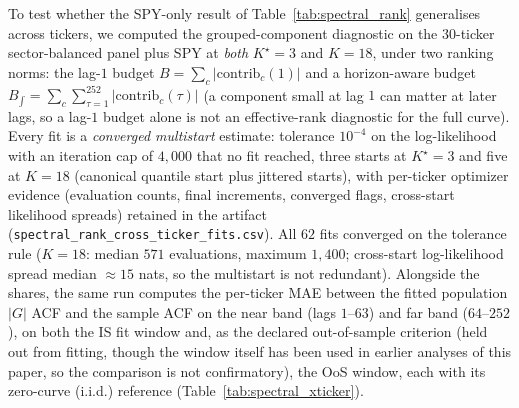 To test whether the SPY-only result of Table~\ref{tab:spectral_rank} generalises across tickers, we computed the grouped-component diagnostic on the 30-ticker sector-balanced panel plus SPY at \emph{both} $K^\star = 3$ and $K = 18$, under two ranking norms: the lag-$1$ budget $B = \sum_c |\mathrm{contrib}_c(1)|$ and a horizon-aware budget $B_{\int} = \sum_c \sum_{\tau=1}^{252} |\mathrm{contrib}_c(\tau)|$ (a component small at lag $1$ can matter at later lags, so a lag-$1$ budget alone is not an effective-rank diagnostic for the full curve). Every fit is a \emph{converged multistart} estimate: tolerance $10^{-4}$ on the log-likelihood with an iteration cap of $4{,}000$ that no fit reached, three starts at $K^\star = 3$ and five at $K = 18$ (canonical quantile start plus jittered starts), with per-ticker optimizer evidence (evaluation counts, final increments, converged flags, cross-start likelihood spreads) retained in the artifact (\texttt{spectral\_rank\_cross\_ticker\_fits.csv}). All $62$ fits converged on the tolerance rule ($K = 18$: median $571$ evaluations, maximum $1{,}400$; cross-start log-likelihood spread median $\approx 15$ nats, so the multistart is not redundant). Alongside the shares, the same run computes the per-ticker MAE between the fitted population $|G|$ ACF and the sample ACF on the near band (lags $1$--$63$) and far band ($64$--$252$), on both the IS fit window and, as the declared out-of-sample criterion (held out from fitting, though the window itself has been used in earlier analyses of this paper, so the comparison is not confirmatory), the OoS window, each with its zero-curve (i.i.d.) reference (Table~\ref{tab:spectral_xticker}).

